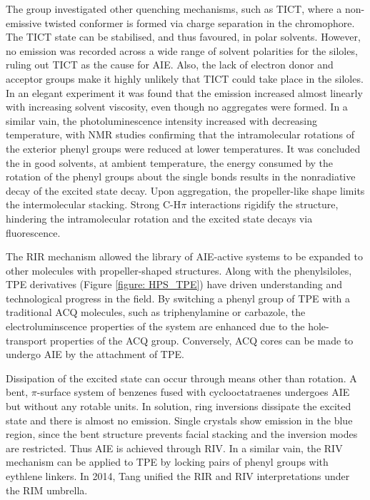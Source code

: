 The group investigated other quenching mechanisms, such as \ac{TICT}, where a non-emissive twisted conformer is formed via charge separation in the chromophore. The \ac{TICT} state can be stabilised, and thus favoured, in polar solvents. However, no emission was recorded across a wide range of solvent polarities for the siloles, ruling out \ac{TICT} as the cause for \ac{AIE}. Also, the lack of electron donor and acceptor groups make it highly unlikely that \ac{TICT} could take place in the siloles. In an elegant experiment it was found that the emission increased almost linearly with increasing solvent viscosity, even though no aggregates were formed. In a similar vain, the photoluminescence intensity increased with decreasing temperature, with NMR studies confirming that the intramolecular rotations of the exterior phenyl groups were reduced at lower temperatures. It was concluded the in good solvents, at ambient temperature, the energy consumed by the rotation of the phenyl groups about the single bonds results in the nonradiative decay of the excited state decay. Upon aggregation, the propeller-like shape limits the intermolecular stacking. Strong C-H\textperiodcentered\textperiodcentered\textperiodcentered$\pi$ interactions rigidify the structure, hindering the intramolecular rotation and the excited state decays via fluorescence.\cite{Chen2003}

The \ac{RIR} mechanism allowed the library of \ac{AIE}-active systems to be expanded to other molecules with propeller-shaped structures. Along with the phenylsiloles, \ac{TPE} derivatives (Figure \ref{figure: HPS_TPE}) have driven understanding and technological progress in the field.\cite{Hong2009,Wang2010a,Hong2011,Mei2014,Hu2014,Mei2015} By switching a phenyl group of \ac{TPE} with a traditional \ac{ACQ} molecules, such as triphenylamine or carbazole, the electroluminscence properties of the system are enhanced due to the hole-transport properties of the \ac{ACQ} group.\cite{Chan2014} Conversely, \ac{ACQ} cores can be made to undergo \ac{AIE} by the attachment of \ac{TPE}.\cite{Yuan2010a}

Dissipation of the excited state can occur through means other than rotation. A bent, $\pi$-surface system of benzenes fused with cyclooctatraenes undergoes \ac{AIE} but without any rotable units.\cite{Nishiuchi2013} In solution, ring inversions dissipate the excited state and there is almost no emission. Single crystals show emission in the blue region, since the bent structure prevents facial stacking and the inversion modes are restricted. Thus \ac{AIE} is achieved through \ac{RIV}. In a similar vain, the \ac{RIV} mechanism can be applied to \ac{TPE} by locking pairs of phenyl groups with eythlene linkers. In 2014, Tang unified the \ac{RIR} and \ac{RIV} interpretations under the \ac{RIM} umbrella.\cite{Leung2014}

